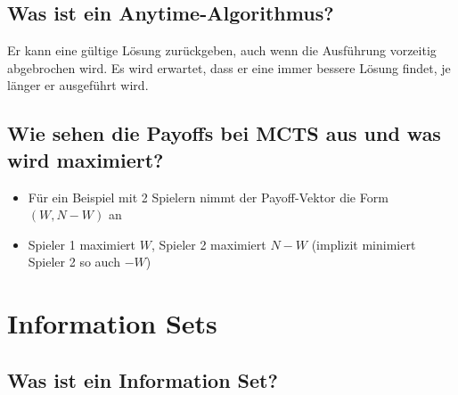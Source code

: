 \documentclass[a4paper]{article}
\begin{document}
		\subsection{Was ist ein Anytime-Algorithmus?}
		
		Er kann eine gültige Lösung zurückgeben, auch wenn die Ausführung vorzeitig abgebrochen wird.
		Es wird erwartet, dass er eine immer bessere Lösung findet, je länger er ausgeführt wird.
		
		\subsection{Wie sehen die Payoffs bei MCTS aus und was wird maximiert?}
		
		\begin{itemize}
			\item Für ein Beispiel mit 2 Spielern nimmt der Payoff-Vektor die Form $(W, N-W)$ an
			\item Spieler 1 maximiert $W$, Spieler 2 maximiert $N-W$ (implizit minimiert Spieler 2 so auch $-W$)
		\end{itemize}
	
	\section{Information Sets}
	
		\subsection{Was ist ein Information Set?}
		
		
		
		
		
		
		
		
	
\end{document}
